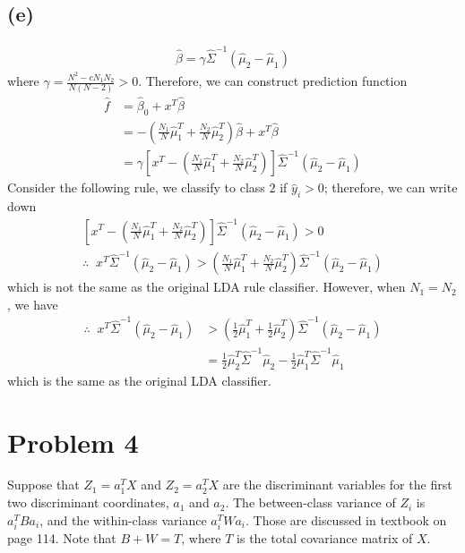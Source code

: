 \documentclass[pra,groupedaddress,amsmath,amssymb, column]{revtex4}
\begin{document}
\subsection*{(e)}
\begin{align}
 \hat\beta =\gamma \hat{\Sigma}^{-1}(\hat\mu_2-\hat\mu_1)   
\end{align}
where $\gamma = \frac{N^2 - cN_1N_2}{N(N-2)}>0$. 
Therefore, we can construct prediction function
\begin{align}
\hat f &= \hat\beta_0 + x^T\hat\beta \\ 
&= - \left(  \frac{N_1}{N}\hat{\mu}_1^T+\frac{N_2}{N}\hat{\mu}_2^T  \right) \hat\beta + x^T\hat{\beta}\\
&=\gamma\left[x^T - \left(  \frac{N_1}{N}\hat{\mu}_1^T+\frac{N_2}{N}\hat{\mu}_2^T  \right)\right]  \hat{\Sigma}^{-1}(\hat\mu_2-\hat\mu_1)   
\end{align}
Consider the following rule, we classify to class $2$ if $\hat y_i>0$; therefore, we can write down
\begin{align}
\left[x^T - \left(  \frac{N_1}{N}\hat{\mu}_1^T+\frac{N_2}{N}\hat{\mu}_2^T  \right)\right]  \hat{\Sigma}^{-1}(\hat\mu_2-\hat\mu_1)   > 0  \\
\therefore\;\;   x^T \hat{\Sigma}^{-1}(\hat\mu_2-\hat\mu_1) >  \left(  \frac{N_1}{N}\hat{\mu}_1^T+\frac{N_2}{N}\hat{\mu}_2^T  \right) \hat{\Sigma}^{-1}(\hat\mu_2-\hat\mu_1)   
\end{align}
which is not the same as the original LDA rule classifier. However, when $N_1= N_2$, we have
\begin{align}
\therefore\;\;   x^T \hat{\Sigma}^{-1}(\hat\mu_2-\hat\mu_1) &>  \left(  \frac{1}{2}\hat{\mu}_1^T+\frac{1}{2}\hat{\mu}_2^T  \right) \hat{\Sigma}^{-1}(\hat\mu_2-\hat\mu_1) \\
  &= \frac{1}{2}\hat{\mu}_2^T\hat{\Sigma}^{-1}\hat{\mu}_2-\frac{1}{2}\hat{\mu}_1^T \hat{\Sigma}^{-1}\hat{\mu}_1 
\end{align}
which is the same as the original LDA classifier.

\section*{Problem 4}
Suppose that $Z_1=a_1^TX$ and $Z_2=a_2^TX$ are the discriminant variables for the first two discriminant coordinates, $a_1$ and $a_2$. The between-class variance of $Z_i$ is $a_i^TBa_i$, and the within-class variance $a_i^TWa_i$. Those are discussed in textbook on page 114. Note that $B+W=T$, where $T$ is the total covariance matrix of $X$.
\end{document}
